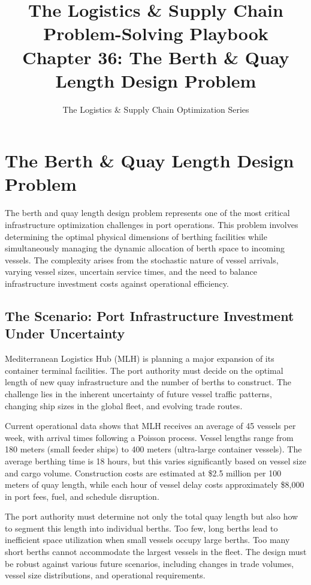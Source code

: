 \documentclass{article}
\title{The Logistics \& Supply Chain Problem-Solving Playbook\\
Chapter 36: The Berth \& Quay Length Design Problem}
\author{The Logistics \& Supply Chain Optimization Series}
\date{}
\begin{document}
\maketitle

\section{The Berth \& Quay Length Design Problem}

The berth and quay length design problem represents one of the most critical infrastructure optimization challenges in port operations. This problem involves determining the optimal physical dimensions of berthing facilities while simultaneously managing the dynamic allocation of berth space to incoming vessels. The complexity arises from the stochastic nature of vessel arrivals, varying vessel sizes, uncertain service times, and the need to balance infrastructure investment costs against operational efficiency.

\subsection{The Scenario: Port Infrastructure Investment Under Uncertainty}

Mediterranean Logistics Hub (MLH) is planning a major expansion of its container terminal facilities. The port authority must decide on the optimal length of new quay infrastructure and the number of berths to construct. The challenge lies in the inherent uncertainty of future vessel traffic patterns, changing ship sizes in the global fleet, and evolving trade routes.

Current operational data shows that MLH receives an average of 45 vessels per week, with arrival times following a Poisson process. Vessel lengths range from 180 meters (small feeder ships) to 400 meters (ultra-large container vessels). The average berthing time is 18 hours, but this varies significantly based on vessel size and cargo volume. Construction costs are estimated at \$2.5 million per 100 meters of quay length, while each hour of vessel delay costs approximately \$8,000 in port fees, fuel, and schedule disruption.

The port authority must determine not only the total quay length but also how to segment this length into individual berths. Too few, long berths lead to inefficient space utilization when small vessels occupy large berths. Too many short berths cannot accommodate the largest vessels in the fleet. The design must be robust against various future scenarios, including changes in trade volumes, vessel size distributions, and operational requirements.
\end{document}
